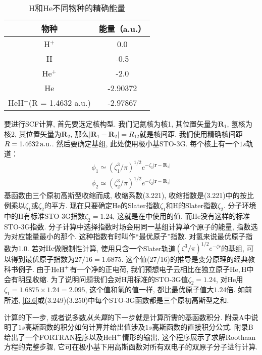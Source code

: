 \begin{table}[H]
	\centering
	\caption{H和He不同物种的精确能量}
	\begin{tabular}{cc}
		\hline
		物种 & 能量（a.u.）\\\hline
		H$^+$      & 0.0\\
		H     & -0.5\\
		He$^+$     & -2.0\\
		He     & -2.90372\\
		HeH$^+$(R = 1.4632 a.u.)&-2.97867\\\hline
	\end{tabular}
	\label{t3.4}
\end{table}
要进行SCF计算, 首先要选定核构型. 
我们记氦核为核1, 其位置矢量为$\mathbf{R}_1$, 
氢核为核2, 其位置矢量为$\mathbf{R}_2$, 
那么$|\mathbf{R}_1-\mathbf{R}_2|=R_{12}$就是核间距. 
我们使用精确核间距$R=1.4632\,\mathrm{a.u.}$. 
然后要确定基组, 此处使用极小基STO-3G. 
每个核上有一个$1s$轨道：
\begin{align}
	\phi_1 \simeq (\zeta_1^3/\pi)^{1/2} e^{-\zeta_1|\mathbf{r-R}_1|}\\
	\phi_2 \simeq (\zeta_2^3/\pi)^{1/2} e^{-\zeta_2|\mathbf{r-R}_1|}
\end{align}
基函数由三个原初高斯型收缩而成, 
收缩系数(3.221), 
收缩指数是(3.221)中的按比例乘以$\zeta_1$或$\zeta_2$的平方. 
现在只要确定$\mathrm{He}$的Slater指数$\zeta_1$和$\mathrm{H}$的Slater指数$\zeta_2$. 
分子环境中的$\mathrm{H}$有标准STO-3G指数$\zeta_2=1.24$, 
这就是在中使用的值. 
而$\mathrm{He}$没有这样的标准STO-3G指数. 
分子计算中选择指数时场会用同一基组计算单个原子的能量, 
指数选为对应能量最小的那个. 
这种指数有时叫作``最优原子''指数. 
对氢来说最优原子指数为1.0. 
若对$\mathrm{He}$做限制性\hft 计算, 
使用只含一个Slater轨道$(\zeta^3/\pi)^{1/2}e^{-\zeta r}$的基组, 
可以得到最优原子指数为$27/16=1.6875$. 
这个值(27/16)的推导是变分原理的经典教科书例子.
由于$\mathrm{HeH}^+$有一个净的正电荷, 
我们预想电子云相比在独立原子$\mathrm{He,H}$中会有明显收缩. 
为了说明问题我们会对$\mathrm{H}$用标准的STO-3G值$\zeta_2=1.24$, 
对$\mathrm{He}$用$\zeta_1=1.6875\times 1.24=2.095$, 
这个值和氢的值一样, 
都比最优原子值大$1.24$倍. 
如前所述, 
\autoref{f3.6}或(3.249)(3.250)中每个STO-3G函数都是三个原初高斯型之和.


计算的下一步, 
或者说多数\emph{从头算}的下一步就是计算所需的基函数积分. 
附录A中说明了$1s$高斯函数的积分如何计算并给出值涉及$1s$高斯函数的直接积分公式. 
附录B给出了一个FORTRAN程序以及$\mathrm{HeH}^+$情形的输出, 
这个程序展示了求解Roothaan方程的完整步骤, 
它可在极小基下用高斯函数对所有双电子的双原子分子进行计算. 

